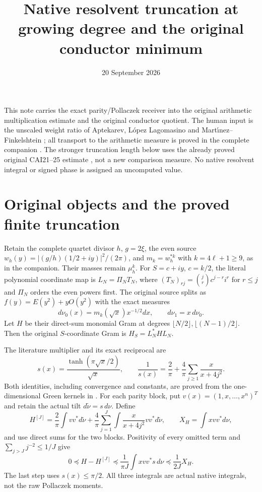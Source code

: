 \documentclass[11pt]{article}
\title{Native resolvent truncation at growing degree and the original conductor minimum}
\author{}
\date{20 September 2026}
\begin{document}
\maketitle
This note carries the exact parity/Pollaczek receiver into the original
arithmetic multiplication estimate and the original conductor quotient.
The human input is the unscaled weight ratio of Aptekarev, L\'opez
Lagomasino and Mart\'{\i}nez--Finkelshtein \cite{ALM}; all transport to
the arithmetic measure is proved in the complete companion \cite{PP}.
The stronger truncation length below uses the already proved original
CAI21--25 estimate \cite{CAI}, not a new comparison measure. No native
resolvent integral or signed phase is assigned an uncomputed value.

\section{Original objects and the proved finite truncation}
Retain the complete quartet divisor $h$, $g=2\xi$, the even source
$w_h(y)=|(g/h)(1/2+iy)|^2/(2\pi)$, and $m_k=w_h^{*k}$ with
$k=4\ell+1\ge9$, as in the companion. Their masses remain
$\mu_h^k$. For $S=c+iy$, $c=k/2$, the literal polynomial coordinate
map is $L_N=\Pi_NT_N$, where
$(T_N)_{rj}=\binom jr c^{j-r}i^r$ for $r\le j$ and $\Pi_N$ orders
the even powers first. The original source splits as
$f(y)=E(y^2)+yO(y^2)$ with the exact measures
\[
 d\nu_0(x)=m_k(\sqrt x)x^{-1/2}dx,\qquad d\nu_1=x\,d\nu_0.
\]
Let $H$ be their direct-sum monomial Gram at degrees
$\lfloor N/2\rfloor,\lfloor(N-1)/2\rfloor$. Then the original
$S$-coordinate Gram is $H_S=L_N^*HL_N$.

The literature multiplier and its exact reciprocal are
\[
 s(x)=\frac{\tanh(\pi\sqrt x/2)}{\sqrt x},\qquad
 \frac1{s(x)}=\frac2\pi+\frac4\pi\sum_{j\ge1}\frac{x}{x+4j^2}.
\]
Both identities, including convergence and constants, are proved from
the one-dimensional Green kernels in \cite{PP}. For each parity block,
put $v(x)=(1,x,\ldots,x^n)^T$ and retain the actual tilt
$d\widetilde\nu=s\,d\nu$. Define
\[
 H^{[J]}=\frac2\pi\int vv^*d\widetilde\nu
 +\frac4\pi\sum_{j=1}^J\int\frac{x}{x+4j^2}vv^*d\widetilde\nu,
 \qquad X_H=\int xvv^*d\nu,
\]
and use direct sums for the two blocks. Positivity of every omitted
term and $\sum_{j>J}j^{-2}\le1/J$ give
\begin{equation}\tag{TR1}\label{eq:tail}
 0\preceq H-H^{[J]}\preceq\frac1{\pi J}\int xvv^*s\,d\nu
                                  \preceq\frac1{2J}X_H.
\end{equation}
The last step uses $s(x)\le\pi/2$. All three integrals are actual
native integrals, not the raw Pollaczek moments.
\end{document}
